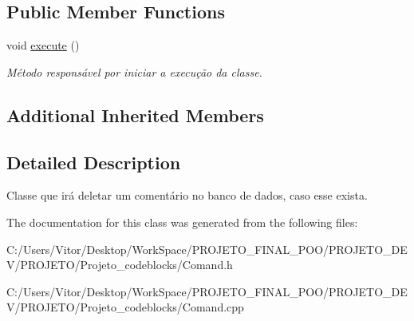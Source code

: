\subsection*{Public Member Functions}
\begin{DoxyCompactItemize}
\item 
\hypertarget{class_command_delete_coment_ae614055e5d5b28ef6921edbab3b99a7c}{void \hyperlink{class_command_delete_coment_ae614055e5d5b28ef6921edbab3b99a7c}{execute} ()}\label{class_command_delete_coment_ae614055e5d5b28ef6921edbab3b99a7c}

\begin{DoxyCompactList}\small\item\em Método responsável por iniciar a execução da classe. \end{DoxyCompactList}\end{DoxyCompactItemize}
\subsection*{Additional Inherited Members}


\subsection{Detailed Description}
Classe que irá deletar um comentário no banco de dados, caso esse exista. 

The documentation for this class was generated from the following files\-:\begin{DoxyCompactItemize}
\item 
C\-:/\-Users/\-Vitor/\-Desktop/\-Work\-Space/\-P\-R\-O\-J\-E\-T\-O\-\_\-\-F\-I\-N\-A\-L\-\_\-\-P\-O\-O/\-P\-R\-O\-J\-E\-T\-O\-\_\-\-D\-E\-V/\-P\-R\-O\-J\-E\-T\-O/\-Projeto\-\_\-codeblocks/Comand.\-h\item 
C\-:/\-Users/\-Vitor/\-Desktop/\-Work\-Space/\-P\-R\-O\-J\-E\-T\-O\-\_\-\-F\-I\-N\-A\-L\-\_\-\-P\-O\-O/\-P\-R\-O\-J\-E\-T\-O\-\_\-\-D\-E\-V/\-P\-R\-O\-J\-E\-T\-O/\-Projeto\-\_\-codeblocks/Comand.\-cpp\end{DoxyCompactItemize}
